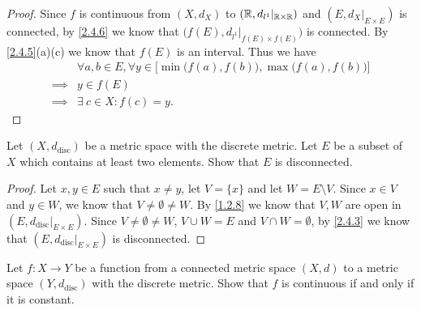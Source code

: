 \begin{proof}
  Since \(f\) is continuous from \((X, d_X)\) to \((\mathbb{R}, d_{l^1}|_{\mathbb{R} \times \mathbb{R}})\) and \((E, d_X|_{E \times E})\) is connected, by \cref{2.4.6} we know that \(\big(f(E), d_{l^1}|_{f(E) \times f(E)}\big)\) is connected.
  By \cref{2.4.5}(a)(c) we know that \(f(E)\) is an interval.
  Thus we have
  \begin{align*}
             & \forall a, b \in E, \forall y \in \Big[\min\big(f(a), f(b)\big), \max\big(f(a), f(b)\big)\Big] \\
    \implies & y \in f(E)                                                                                     \\
    \implies & \exists\ c \in X : f(c) = y.
  \end{align*}
\end{proof}

\exercisesection

\begin{ex}\label{ex:2.4.1}
  Let \((X, d_{\text{disc}})\) be a metric space with the discrete metric.
  Let \(E\) be a subset of \(X\) which contains at least two elements.
  Show that \(E\) is disconnected.
\end{ex}

\begin{proof}
  Let \(x, y \in E\) such that \(x \neq y\), let \(V = \{x\}\) and let \(W = E \setminus V\).
  Since \(x \in V\) and \(y \in W\), we know that \(V \neq \emptyset \neq W\).
  By \cref{1.2.8} we know that \(V, W\) are open in \((E, d_{\text{disc}}|_{E \times E})\).
  Since \(V \neq \emptyset \neq W\), \(V \cup W = E\) and \(V \cap W = \emptyset\), by \cref{2.4.3} we know that \((E, d_{\text{disc}}|_{E \times E})\) is disconnected.
\end{proof}

\begin{ex}\label{ex:2.4.2}
  Let \(f : X \to Y\) be a function from a connected metric space \((X, d)\) to a metric space \((Y, d_{\text{disc}})\) with the discrete metric.
  Show that \(f\) is continuous if and only if it is constant.
\end{ex}

